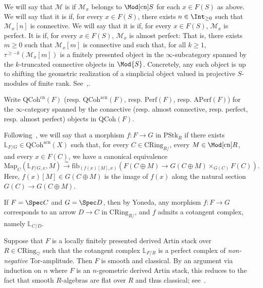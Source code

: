 \documentclass[10pt]{amsart}
\begin{document}
\begin{definition}
We will say that $\mathcal{M}$ is  if $\mathcal{M}_x$ belongs to $\Mod[\mathrm{cn}]{S}$ for each $x\in F(S)$ as above. We will say that it is  if, for every $x\in F(S)$, there exists $n\in \Int_{\geq 0}$ such that $\mathcal{M}_x[n]$ is connective. We will say that it is  if, for every $x\in F(S)$, $\mathcal{M}_x$ is perfect. It is  if, for every $x\in F(S)$, $\mathcal{M}_x$ is almost perfect: That is, there exists $m\ge 0$ such that $\mathcal{M}_x[m]$ is connective and such that, for all $k \ge 1$, $\tau^{\ge -k}(\mathcal{M}_x[m])$ is a finitely presented object in the $\infty$-subcategory spanned by the $k$-truncated connective objects in $\Mod{S}$. Concretely, any such object is up to shifting the geometric realization of a simplicial object valued in projective $S$-modules of finite rank. See~\cite[\S 7.2.4]{Lurie2017-oh},\cite[Appendix A]{MR4560539}.

Write $\mathrm{QCoh}^{\mathrm{cn}}(F)$ (resp. $\mathrm{QCoh}^{\mathrm{acn}}(F)$, resp. $\mathrm{Perf}(F)$, resp. $\mathrm{APerf}(F)$) for the  $\infty$-category spanned by the connective (resp. almost connective, resp. perfect, resp. almost perfect) objects in $\mathrm{QCoh}(F)$.
\end{definition}


\begin{definition}
\label{defn:cotangent_complex}
Following~\cite[\S 17.2.4]{Lurie2018-kh}, we will say that a morphism $f:F\to G$ in $\mathrm{PStk}_{R}$  if there exists $\mathbb{L}_{F/G}\in \mathrm{QCoh}^{\mathrm{acn}}(X)$ such that, for every $C\in \mathrm{CRing}_{R/}$, every $M\in \Mod[\mathrm{cn}]{R}$, and every $x\in F(C)$, we have a canonical equivalence
\[
\mathrm{Map}_{C}(\mathbb{L}_{F/G,x},M)\xrightarrow{\simeq}\mathrm{fib}_{(f(x)[M],x)}(F(C\oplus M)\to G(C\oplus M)\times_{G(C)}F(C)).
\]
Here, $f(x)[M]\in G(C\oplus M)$ is the image of $f(x)$ along the natural section $G(C)\to G(C\oplus M)$.

If $F = \Spec C$ and $G = \Spec D$, then by Yoneda, any morphism $f:F\to G$ corresponds to an arrow $D\to C$ in $\mathrm{CRing}_{R/}$, and $f$ admits a cotangent complex, namely $\mathbb{L}_{C/D}$.
\end{definition}

\begin{remark}
\label{rem:classicality}
Suppose that $F$ is a locally finitely presented derived Artin stack over $R\in \mathrm{CRing}_{\heartsuit}$ such that the cotangent complex $\mathbb{L}_{F/R}$ is a perfect complex of \emph{non-negative} Tor-amplitude. Then $F$ is smooth and classical. By an argument via induction on $n$ where $F$ is an $n$-geometric derived Artin stack, this reduces to the fact that smooth $R$-algebras are flat over $R$ and thus classical; see~\cite[Prop. 3.4.9]{lurie_thesis}.
\end{remark}
\end{document}
